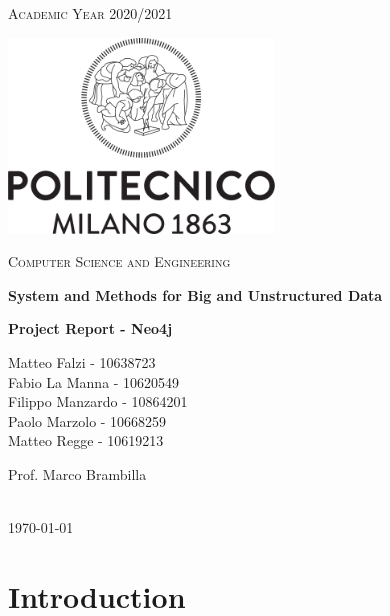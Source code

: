 \documentclass[table, 12pt]{article}
\begin{document}
\setlength{\parindent}{0em}

\begin{titlepage}
    \centering
    \vspace{2cm}
    \scshape\large Academic Year 2020/2021 \par
    \vfill
    \includegraphics[width=200pt]{images/LogoPoliMI}\par\vspace{1cm}
    {\scshape\LARGE Computer Science and Engineering \par}
    \vspace{1.5cm}
    {\Large\bfseries System and Methods for Big and Unstructured Data \par}
    \vspace{0.5cm}
    {\huge\bfseries \textbf{Project Report - Neo4j} \par}
    \vspace{2cm}
    {\large{Matteo Falzi - 10638723\\ Fabio La Manna - 10620549 \\ Filippo Manzardo - 10864201 \\ Paolo Marzolo - 10668259 \\ Matteo Regge -  10619213}\par}
    \vfill
    {\large Prof. Marco Brambilla }
    \vfill
    {\large \textbf{}\\ \today \par}
\end{titlepage}
\thispagestyle{plain}
\mbox{}


\section{Introduction}
\end{document}
